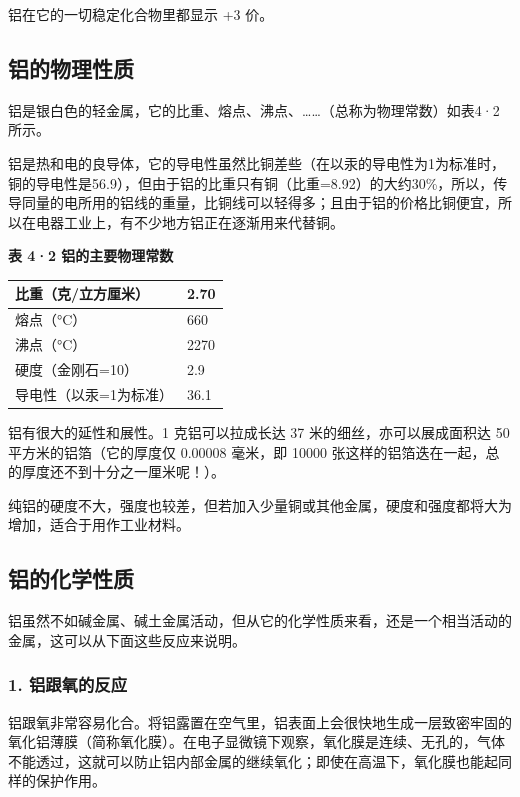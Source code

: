 铝在它的一切稳定化合物里都显示 +3 价。

\subsection{铝的物理性质}

铝是银白色的轻金属，它的比重、熔点、沸点、\ldots\ldots（总称为物理常数）如表4·2所示。

铝是热和电的良导体，它的导电性虽然比铜差些（在以汞的导电性为1为标准时，铜的导电性是56.9），但由于铝的比重只有铜（比重=8.92）的大约30\%，所以，传导同量的电所用的铝线的重量，比铜线可以轻得多；且由于铝的价格比铜便宜，所以在电器工业上，有不少地方铝正在逐渐用来代替铜。

\textbf{表 4·2 铝的主要物理常数}

{\def\LTcaptype{none} %
\begin{longtable}[]{@{}ll@{}}
\toprule\noalign{}
比重（克/立方厘米） & 2.70 \\
\midrule\noalign{}
\endhead
\bottomrule\noalign{}
\endlastfoot
熔点（°C） & 660 \\
沸点（°C） & 2270 \\
硬度（金刚石=10） & 2.9 \\
导电性（以汞=1为标准） & 36.1 \\
\end{longtable}
}

铝有很大的延性和展性。1 克铝可以拉成长达 37 米的细丝，亦可以展成面积达
50 平方米的铝箔（它的厚度仅 0.00008 毫米，即 10000
张这样的铝箔迭在一起，总的厚度还不到十分之一厘米呢！）。

纯铝的硬度不大，强度也较差，但若加入少量铜或其他金属，硬度和强度都将大为增加，适合于用作工业材料。

\subsection{铝的化学性质}

铝虽然不如碱金属、碱土金属活动，但从它的化学性质来看，还是一个相当活动的金属，这可以从下面这些反应来说明。

\subsubsection{1. 铝跟氧的反应}

铝跟氧非常容易化合。将铝露置在空气里，铝表面上会很快地生成一层致密牢固的氧化铝薄膜（简称氧化膜）。在电子显微镜下观察，氧化膜是连续、无孔的，气体不能透过，这就可以防止铝内部金属的继续氧化；即使在高温下，氧化膜也能起同样的保护作用。

